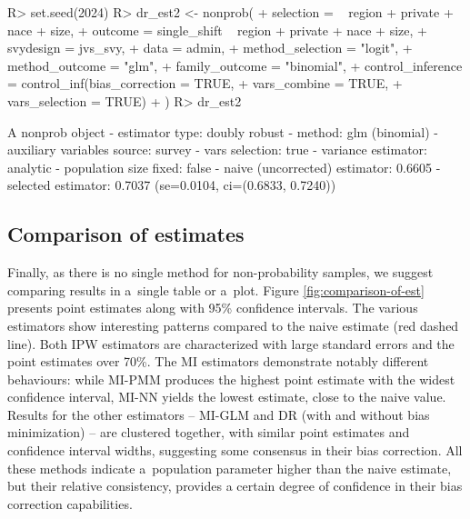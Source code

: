 \documentclass[
]{jss}
\begin{document}
\begin{CodeChunk}
\begin{CodeInput}
R> set.seed(2024)
R> dr_est2 <- nonprob(
+   selection = ~ region + private + nace + size,
+   outcome = single_shift ~ region + private + nace + size,
+   svydesign = jvs_svy,
+   data = admin,
+   method_selection = "logit",
+   method_outcome = "glm",
+   family_outcome = "binomial",
+   control_inference = control_inf(bias_correction = TRUE,
+                                   vars_combine = TRUE,
+                                   vars_selection = TRUE)
+ )
R> dr_est2
\end{CodeInput}
\begin{CodeOutput}
A nonprob object
 - estimator type: doubly robust
 - method: glm (binomial)
 - auxiliary variables source: survey
 - vars selection: true
 - variance estimator: analytic
 - population size fixed: false
 - naive (uncorrected) estimator: 0.6605
 - selected estimator: 0.7037 (se=0.0104, ci=(0.6833, 0.7240))
\end{CodeOutput}
\end{CodeChunk}

\subsection{Comparison of estimates}\label{comparison-of-estimates}

Finally, as there is no single method for non-probability samples, we
suggest comparing results in a~single table or a~plot. Figure
\ref{fig:comparison-of-est} presents point estimates along with 95\%
confidence intervals. The various estimators show interesting patterns
compared to the naive estimate (red dashed line). Both IPW estimators
are characterized with large standard errors and the point estimates
over 70\%. The MI estimators demonstrate notably different behaviours:
while MI-PMM produces the highest point estimate with the widest
confidence interval, MI-NN yields the lowest estimate, close to the
naive value. Results for the other estimators -- MI-GLM and DR (with and
without bias minimization) -- are clustered together, with similar point
estimates and confidence interval widths, suggesting some consensus in
their bias correction. All these methods indicate a~population parameter
higher than the naive estimate, but their relative consistency, provides
a certain degree of confidence in their bias correction capabilities.
\end{document}
